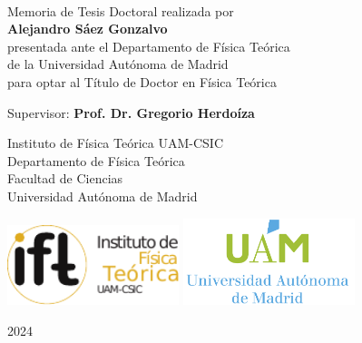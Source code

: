 \begin{titlepage}
    \begin{addmargin}[-1cm]{-3cm}
    \begin{center}
        \large

        \hfill

        \vfill

        \begingroup
            \color{CTtitle} \\ \bigskip
        \endgroup

        Memoria de Tesis Doctoral realizada por \\ \bigskip
        \textbf{Alejandro S\'aez Gonzalvo} \\ \bigskip
        presentada ante el Departamento de F\'isica Te\'orica \\
		de la Universidad Aut\'onoma de Madrid \\
        para optar al T\'itulo de Doctor en F\'isica Te\'orica

        \vfill

        Supervisor: \textbf{Prof. Dr. Gregorio Herdo\'iza}
        
        \bigskip
        
        Instituto de F\'isica Te\'orica UAM-CSIC \\
        Departamento de F\'isica Te\'orica \\
        Facultad de Ciencias \\
        Universidad Aut\'onoma de Madrid 
        
        \vfill
        
        \includegraphics[width=5cm]{gfx/LogoIFT.pdf} \hfill
        \includegraphics[width=5cm]{gfx/LogoUAMVertical.png} \\ 
        
        \vfill

        2024

        \vfill

    \end{center}
  \end{addmargin}
\end{titlepage}

